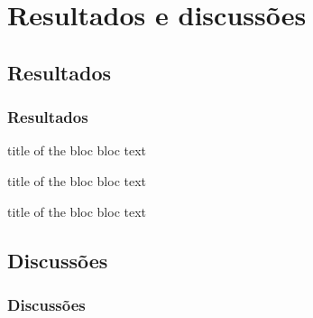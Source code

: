 \documentclass{beamer}
\begin{document}
    \section{Resultados e discussões}

        \subsection{Resultados}

        \begin{frame}\frametitle{Resultados}
        \begin{block}{title of the bloc}
        bloc text
        \end{block}

        \begin{exampleblock}{title of the bloc}
        bloc text
        \end{exampleblock}


        \begin{alertblock}{title of the bloc}
        bloc text
        \end{alertblock}
        \end{frame}

        \subsection{Discussões}

        \begin{frame}\frametitle{Discussões}
        \begin{figure}
        \end{figure}
        \end{frame}
\end{document}
